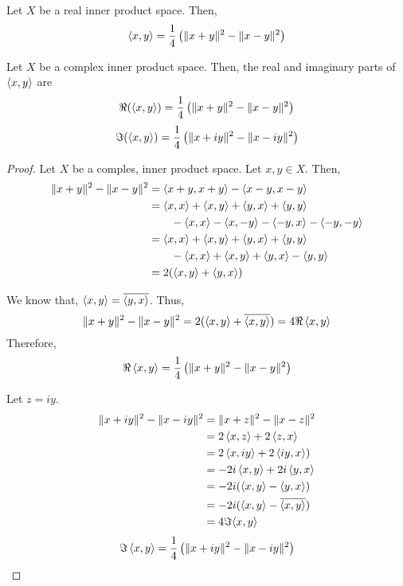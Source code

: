 \begin{remark}
	Let $X$ be a real inner product space.
	Then,
	\[ \left\langle x,y \right\rangle = \frac{1}{4}\left(\|x+y\|^2 - \|x-y\|^2 \right) \]
\end{remark}
\begin{theorem}
	Let $X$ be a complex inner product space.
	Then, the real and imaginary parts of $\left\langle x,y \right\rangle$ are
	\[ \Re(\left\langle x,y \right\rangle) = \frac{1}{4}\left(\|x+y\|^2 - \|x-y\|^2 \right) \]
	\[ \Im(\left\langle x,y \right\rangle) = \frac{1}{4}\left(\|x+iy\|^2 - \|x-iy\|^2 \right) \]
\end{theorem}
\begin{proof}
	Let $X$ be a comples, inner product space.
	Let $x,y \in X$.
	Then,
	\begin{align*}
		\|x+y\|^2-\|x-y\|^2 
		& = \left\langle x+y,x+y \right\rangle - \left\langle x-y,x-y \right\rangle \\
		& = \left\langle x,x \right\rangle + \left\langle x,y \right\rangle + \left\langle y,x \right\rangle + \left\langle y,y \right\rangle \\
		& \qquad - \left\langle x,x \right\rangle - \left\langle x,-y \right\rangle - \left\langle -y,x \right\rangle - \left\langle -y,-y \right\rangle \\
		& = \left\langle x,x \right\rangle + \left\langle x,y \right\rangle + \left\langle y,x \right\rangle + \left\langle y,y \right\rangle \\
		& \qquad - \left\langle x,x \right\rangle + \left\langle x,y \right\rangle + \left\langle y,x \right\rangle - \left\langle y,y \right\rangle \\
		& = 2(\left\langle x,y \right\rangle + \left\langle y,x \right\rangle)
	\end{align*}

	We know that, $\left\langle x,y \right\rangle = \overline{\left\langle y,x \right\rangle}$.
	Thus, 
	\[ \|x+y\|^2 - \|x-y\|^2 = 2(\left\langle x,y \right\rangle + \overline{\left\langle x,y \right\rangle}) = 4\Re \left\langle x,y \right\rangle \]
	Therefore, 
	\[ \Re \left\langle x,y \right\rangle = \frac{1}{4} \left( \|x+y\|^2-\|x-y\|^2 \right) \]
	
	Let $z = iy$.
	\begin{align*}
		\|x+iy\|^2 - \|x-iy\|^2 
		& = \|x+z\|^2 - \|x-z\|^2 \\
		& = 2\left\langle x,z \right\rangle+2\left\langle z,x \right\rangle \\
		& = 2\left\langle x,iy \right\rangle+2\left\langle iy,x \right\rangle) \\
		& = -2i\left\langle x,y \right\rangle + 2i\left\langle y,x \right\rangle \\
		& = -2i(\left\langle x,y \right\rangle - \left\langle y,x \right\rangle) \\
		& = -2i(\left\langle x,y \right\rangle - \overline{\left\langle x,y \right\rangle}) \\
		& = 4 \Im{\ensuremath{\left\langle x,y \right\rangle}} 
	\end{align*}
	\[ \Im \left\langle x,y \right\rangle = \frac{1}{4} \left( \|x+iy\|^2-\|x-iy\|^2 \right) \]
\end{proof}
